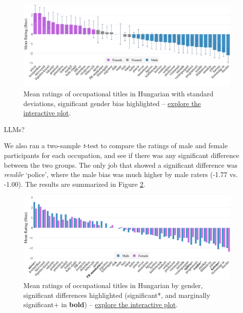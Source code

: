 \documentclass[11pt]{article}
\begin{document}
\begin{figure}[ht]
  \centering
  \includegraphics[width=\linewidth]{../occupations_hu}
  \caption{Mean ratings of occupational titles in Hungarian with standard deviations, significant gender bias highlighted -- \href{https://htmlpreview.github.io/?https://github.com/partigabor/occupational-bias/blob/main/occupations_hu.html}{explore the interactive plot}.}
  \label{fig:occupations_hu}
\end{figure}

LLMs?

We also ran a two-sample \textit{t}-test to compare the ratings of male and female participants for each occupation, and see if there was any significant difference between the two groups. The only job that showed a significant difference was \textit{rendőr} `police', where the male bias was much higher by male raters (-1.77 vs. -1.00). The results are summarized in Figure \ref{fig:occupations_hu_gender}.

\begin{figure}[ht]
  \centering
  \includegraphics[width=\linewidth]{../occupations_hu_gender}
  \caption{Mean ratings of occupational titles in Hungarian by gender, significant differences highlighted (significant*, and marginally significant+ in \textbf{bold}) -- \href{https://htmlpreview.github.io/?https://github.com/partigabor/occupational-bias/blob/main/occupations_hu_gender.html}{explore the interactive plot}.}
  \label{fig:occupations_hu_gender}
\end{figure}
\end{document}
